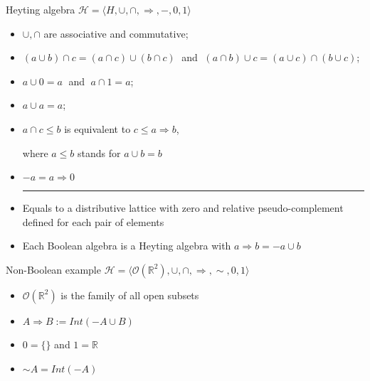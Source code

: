 \documentclass[sans]{beamer}
\begin{document}
\begin{frame}{Heyting algebra}
  $\mathcal{H} = \langle H, \cup, \cap, \Rightarrow, -, 0, 1 \rangle$
  \begin{itemize}
    \item $\cup, \cap$ are associative and commutative;
    \item $(a \cup b) \cap c = (a \cap c) \cup (b \cap c) \;$ and
          $\; (a \cap b) \cup c = (a \cup c) \cap (b \cup c)$;
    \item $a \cup 0 = a \;$ and $\; a \cap 1 = a$;
    \item $a \cup a = a$;
    \item $a \cap c \leq b$ is equivalent to $c \leq a \Rightarrow b$,
      
      where $a \leq b$ stands for $a \cup b = b$

    \item $-a = a \Rightarrow 0$

    \vfill
    \pause
    
    \hrule
    \vfill

    \item Equals to a distributive lattice with zero and relative pseudo-complement defined
          for each pair of elements
    \item Each Boolean algebra is a Heyting algebra with $a \Rightarrow b = -a \cup b$

  \end{itemize}
\end{frame}

\begin{frame}{Non-Boolean example}
  $\mathcal{H} = \langle \mathcal{O}(\mathbb{R}^2), \cup, \cap, \Rightarrow, {\sim}, 0, 1 \rangle$
  \begin{itemize}
    \item $\mathcal{O}(\mathbb{R}^2)$ is the family of all open subsets 
    \item $A \Rightarrow B := Int(-A \cup B)$
    \item $0 = \{\}$ and $1 = \mathbb{R}$
    \item ${\sim} A = Int(-A)$
  \end{itemize}
\end{frame}
\end{document}
